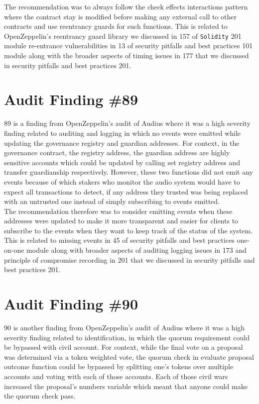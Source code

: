 The recommendation was to always follow the check effects interactions pattern where the contract stay is modified before making any external call to other contracts and use reentrancy guards for such functions. This is related to OpenZeppelin's reentrancy guard library we discussed in 157 of \verb|Solidity| 201 module re-entrance vulnerabilities in 13 of security pitfalls and best practices 101 module along with the broader aspects of timing issues in 177 that we discussed in security pitfalls and best practices 201.

\section{Audit Finding \#89}

89 is a finding from OpenZeppelin's audit of Audius where it was a high severity finding related to auditing and logging in which no events were emitted while updating the governance registry and guardian addresses. For context, in the governance contract, the registry address, the guardian address are highly sensitive accounts which could be updated by calling set registry address and transfer guardianship respectively. However, these two functions did not emit any events because of which stakers who monitor the audio system would have to expect all transactions to detect, if any address they trusted was being replaced with an untrusted one instead of simply subscribing to events emitted.\\

The recommendation therefore was to consider emitting events when these addresses were updated to make it more transparent and easier for clients to subscribe to the events when they want to keep track of the status of the system. This is related to missing events in 45 of security pitfalls and best practices one-on-one module along with broader aspects of auditing logging issues in 173 and principle of compromise recording in 201 that we discussed in security pitfalls and best practices 201.

\section{Audit Finding \#90}

90 is another finding from OpenZeppelin's audit of Audius where it was a high severity finding related to identification, in which the quorum requirement could be bypassed with civil account. For context, while the final vote on a proposal was determined via a token weighted vote, the quorum check in evaluate proposal outcome function could be bypassed by splitting one's tokens over multiple accounts and voting with each of those accounts. Each of those civil wars increased the proposal's numbers variable which meant that anyone could make the quorum check pass.\\

